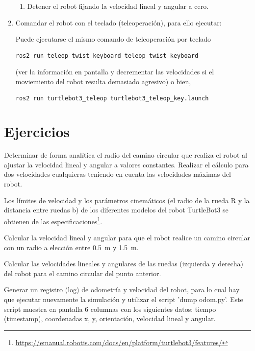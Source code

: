 \documentclass[tp]{lcc}
\begin{document}
\begin{enumerate}
\begin{enumerate}
	\item Detener el robot fijando la velocidad lineal y angular a cero.
	\end{enumerate}

\item Comandar el robot con el teclado (teleoperación), para ello ejecutar:

Puede ejecutarse el mismo comando de teleoperación por teclado
\begin{lstlisting}[style=bash] 
ros2 run teleop_twist_keyboard teleop_twist_keyboard
\end{lstlisting}
(ver la información en pantalla y decrementar las velocidades si el moviemiento del robot
resulta demasiado agresivo)
o bien,
\begin{lstlisting}[style=bash] 
ros2 run turtlebot3_teleop turtlebot3_teleop_key.launch
\end{lstlisting}

\end{enumerate}


\section{Ejercicios}

\ejercicio  Determinar de forma analítica el radio del camino circular que realiza el robot al ajustar la velocidad lineal y angular a valores constantes. Realizar el cálculo para dos velocidades cualquieras teniendo en cuenta las velocidades máximas del robot.

\nota Los límites de velocidad y los parámetros cinemáticos (el radio de la rueda R y la distancia entre ruedas b) de los diferentes modelos del robot TurtleBot3 se obtienen de las especificaciones\footnote{\url{https://emanual.robotis.com/docs/en/platform/turtlebot3/features/}}.

\ejercicio  Calcular la velocidad lineal y angular para que el robot realice un camino circular con un radio a elección entre \SI{0.5}{\meter} y \SI{1.5}{\meter}.

\ejercicio  Calcular las velocidades lineales y angulares de las ruedas (izquierda y derecha) del robot para el camino circular del punto anterior.

\ejercicio Generar un registro (log) de odometría y velocidad del robot, para lo cual hay que ejecutar nuevamente
la simulación y utilizar el script ’dump odom.py’. Este script muestra en pantalla 6 columnas con los siguientes datos: tiempo (timestamp), coordenadas x, y, orientación, velocidad lineal y angular.
\end{document}
